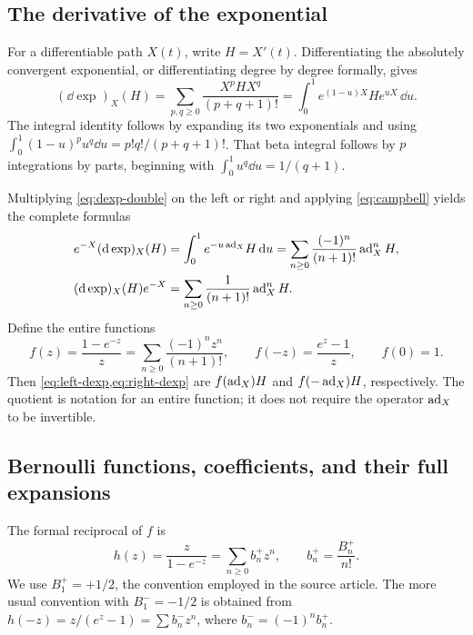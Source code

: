 \subsection{The derivative of the exponential}
For a differentiable path $X(t)$, write $H=X'(t)$. Differentiating the absolutely convergent exponential, or differentiating degree by degree formally, gives
\begin{equation}\label{eq:dexp-double}
 (\dd\exp)_X(H)
 =\sum_{p,q\geq0}\frac{X^pHX^q}{(p+q+1)!}
 =\int_0^1 e^{(1-u)X}He^{uX}\,\dd u.
\end{equation}
The integral identity follows by expanding its two exponentials and using
$\int_0^1(1-u)^p u^q\dd u=p!q!/(p+q+1)!$. That beta integral follows by $p$ integrations by parts, beginning with $\int_0^1u^q\dd u=1/(q+1)$.

Multiplying \cref{eq:dexp-double} on the left or right and applying \cref{eq:campbell} yields the complete formulas
\begin{align}
 e^{-X}(\mathrm d\exp)_X(H)
 &=\int_0^1e^{-u\operatorname{ad}_X}H\,\mathrm d u
 =\sum_{n\geq0}\frac{(-1)^n}{(n+1)!}\operatorname{ad}_X^nH,\label{eq:left-dexp}\\
 (\mathrm d\exp)_X(H)e^{-X}
 &=\sum_{n\geq0}\frac{1}{(n+1)!}\operatorname{ad}_X^nH.\label{eq:right-dexp}
\end{align}
Define the entire functions
\begin{equation}\label{eq:f-def}
 f(z)=\frac{1-e^{-z}}{z}=\sum_{n\geq0}\frac{(-1)^nz^n}{(n+1)!},
 \qquad f(-z)=\frac{e^z-1}{z},\qquad f(0)=1.
\end{equation}
Then \cref{eq:left-dexp,eq:right-dexp} are $f(\operatorname{ad}_X)H$ and $f(-\operatorname{ad}_X)H$, respectively. The quotient is notation for an entire function; it does not require the operator $\operatorname{ad}_X$ to be invertible.

\subsection{Bernoulli functions, coefficients, and their full expansions}\label{sec:bernoulli}
The formal reciprocal of $f$ is
\begin{equation}\label{eq:h-def}
 h(z)=\frac{z}{1-e^{-z}}=\sum_{n\geq0}b_n^+z^n,
 \qquad b_n^+=\frac{B_n^+}{n!}.
\end{equation}
We use $B_1^+=+1/2$, the convention employed in the source article. The more usual convention with $B_1^-=-1/2$ is obtained from
$h(-z)=z/(e^z-1)=\sum b_n^-z^n$, where $b_n^-=(-1)^n b_n^+$.


